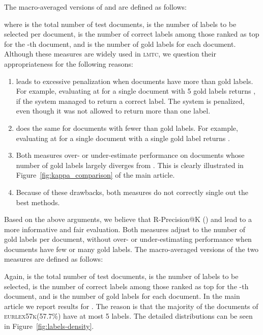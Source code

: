 \documentclass[11pt,a4paper]{article}
\newcommand{\lmtc}{\textsc{lmtc}\xspace}
\newcommand{\newdata}{\textsc{eurlex57k}\xspace}
\begin{document}
\label{app:evaluation}
The macro-averaged versions of  and  are defined as follows:


\noindent where  is the total number of test documents,  is the number of labels to be selected per document,  is the number of correct labels among those ranked as top  for the -th document, and  is the number of gold labels for each document.
Although these measures are widely used in \lmtc, we question their appropriateness for the following reasons:

\begin{enumerate}[leftmargin=1em]
    \item  leads to excessive penalization when documents have more than  gold labels. For example, evaluating at  for a single document with 5 gold labels returns , if the system managed to return a correct label.
    The system is penalized, even though it was not allowed to return more than one label.
    \item  does the same for documents with fewer than  gold labels. For example, evaluating at  for a single document with a single gold label returns .
    \item Both measures over- or under-estimate performance on documents whose number of gold labels largely diverges from . 
    This is clearly illustrated in Figure~\ref{fig:kappa_comparison} of the main article.
    \item Because of these drawbacks, both measures do not correctly single out the best methods.
\end{enumerate}

Based on the above arguments, we believe that R-Precision@K () and  lead to a more informative and fair evaluation. Both measures adjust to the number of gold labels per document, without over- or under-estimating performance when documents have few or many gold labels.
The macro-averaged versions of the two measures are defined as follows:
\vspace{-3mm}

Again,  is the total number of test documents,  is the number of labels to be selected,  is the number of correct labels among those ranked as top  for the -th document, and  is the number of gold labels for each document. In the main article we report results for . The reason is that the majority of the documents of \newdata (57.7\%) have at most 5 labels.
The detailed distributions can be seen in Figure~\ref{fig:labels-density}.
\end{document}
